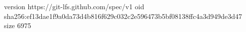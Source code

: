 version https://git-lfs.github.com/spec/v1
oid sha256:ef13dae1f9a0da73d4b816f629c032c2e596473b5bf08138ffc4a3d949de3d47
size 6975
